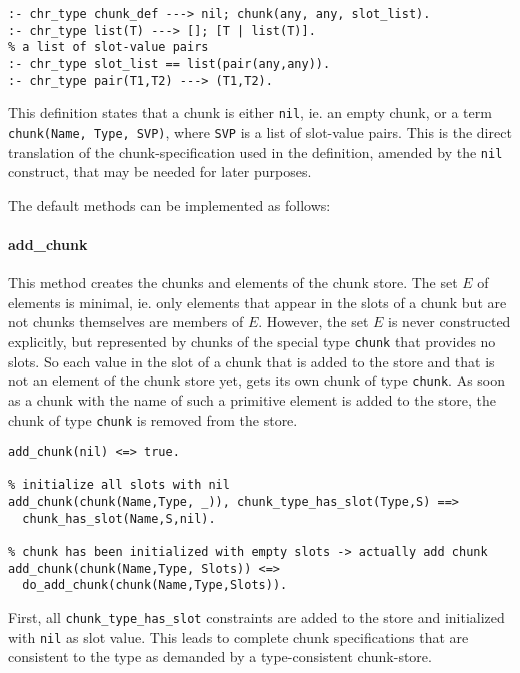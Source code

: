 \begin{lstlisting}
:- chr_type chunk_def ---> nil; chunk(any, any, slot_list).
:- chr_type list(T) ---> []; [T | list(T)].
% a list of slot-value pairs
:- chr_type slot_list == list(pair(any,any)).
:- chr_type pair(T1,T2) ---> (T1,T2).
\end{lstlisting}

This definition states that a chunk is either \verb|nil|, ie. an empty chunk, or a term \verb|chunk(Name, Type, SVP)|, where \verb|SVP| is a list of slot-value pairs. This is the direct translation of the chunk-specification used in the definition, amended by the \verb|nil| construct, that may be needed for later purposes.

The default methods can be implemented as follows:

\paragraph{add\_chunk}

This method creates the chunks and elements of the chunk store. The set $E$ of elements is minimal, ie. only elements that appear in the slots of a chunk but are not chunks themselves are members of $E$. However, the set $E$ is never constructed explicitly, but represented by chunks of the special type \verb|chunk| that provides no slots. So each value in the slot of a chunk that is added to the store and that is not an element of the chunk store yet, gets its own chunk of type \verb|chunk|. As soon as a chunk with the name of such a primitive element is added to the store, the chunk of type \verb|chunk| is removed from the store.

\begin{lstlisting}[caption={Rules for \texttt{add\_chunk}}, label=lst:add_chunk_rules]
% empty chunk will not be added
add_chunk(nil) <=> true.
  
% initialize all slots with nil
add_chunk(chunk(Name,Type, _)), chunk_type_has_slot(Type,S) ==> 
  chunk_has_slot(Name,S,nil).

% chunk has been initialized with empty slots -> actually add chunk
add_chunk(chunk(Name,Type, Slots)) <=>
  do_add_chunk(chunk(Name,Type,Slots)).
\end{lstlisting}

First, all \verb|chunk_type_has_slot| constraints are added to the store and initialized with \verb|nil| as slot value. This leads to complete chunk specifications that are consistent to the type as demanded by a type-consistent chunk-store.

